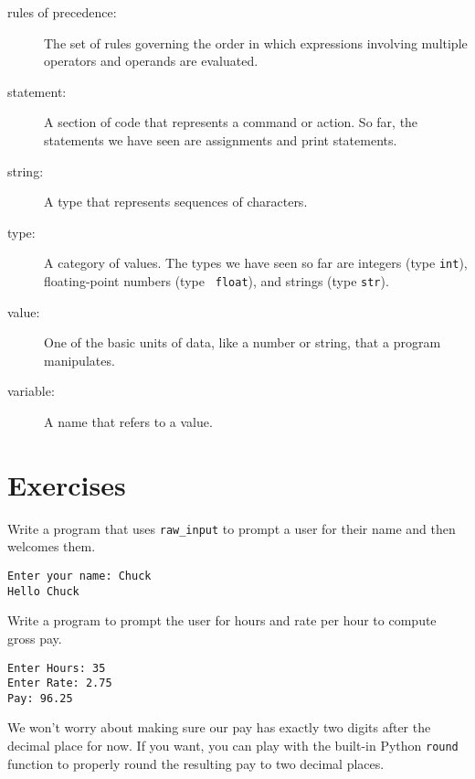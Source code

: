 \begin{description}
\item[rules of precedence:]  The set of rules governing the order in which
expressions involving multiple operators and operands are evaluated.

\item[statement:]  A section of code that represents a command or action.  So
far, the statements we have seen are assignments and print statements.

\item[string:] A type that represents sequences of characters.

\item[type:] A category of values.  The types we have seen so far
are integers (type {\tt int}), floating-point numbers (type {\tt
float}), and strings (type {\tt str}).

\item[value:]  One of the basic units of data, like a number or string, 
that a program manipulates.

\item[variable:]  A name that refers to a value.

\end{description}

\section{Exercises}

\begin{ex}
Write a program that uses  \verb"raw_input" to prompt a user for their name 
and then welcomes them.

\begin{verbatim}
Enter your name: Chuck
Hello Chuck
\end{verbatim}

\end{ex}

\begin{ex}
Write a program to prompt the user for hours and rate per hour to compute
gross pay.
\begin{verbatim}
Enter Hours: 35
Enter Rate: 2.75
Pay: 96.25
\end{verbatim}
\end{ex}
%
We won't worry about making sure our pay has exactly two digits after
the decimal place for now.  If you want, you can play with the 
built-in Python {\tt round} function to properly round the resulting pay
to two decimal places.

